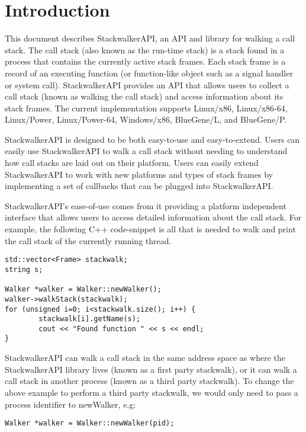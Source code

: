 \section{Introduction}
\label{sec:intro}
This document describes StackwalkerAPI, an API and library for walking a call
stack. The call stack (also known as the run-time stack) is a stack found in a
process that contains the currently active stack frames. Each stack frame is a
record of an executing function (or function-like object such as a signal
handler or system call). StackwalkerAPI provides an API that allows users to
collect a call stack (known as walking the call stack) and access information
about its stack frames. The current implementation supports Linux/x86,
Linux/x86-64, Linux/Power, Linux/Power-64, Windows/x86, BlueGene/L, and BlueGene/P.

StackwalkerAPI is designed to be both easy-to-use and easy-to-extend. Users can
easily use StackwalkerAPI to walk a call stack without needing to understand how
call stacks are laid out on their platform. Users can easily extend
StackwalkerAPI to work with new platforms and types of stack frames by
implementing a set of callbacks that can be plugged into StackwalkerAPI.

StackwalkerAPI's ease-of-use comes from it providing a platform independent
interface that allows users to access detailed information about the call stack.
For example, the following C++ code-snippet is all that is needed to walk and
print the call stack of the currently running thread.

\lstset{language=[GNU]C++,basicstyle=\ttfamily\selectfont\small}
\lstset{numbers=none}
\begin{lstlisting}
std::vector<Frame> stackwalk; 
string s;

Walker *walker = Walker::newWalker();
walker->walkStack(stackwalk);
for (unsigned i=0; i<stackwalk.size(); i++) {
		stackwalk[i].getName(s);
		cout << "Found function " << s << endl;
}	
\end{lstlisting}

StackwalkerAPI can walk a call stack in the same address space as where the
StackwalkerAPI library lives (known as a first party stackwalk), or it can walk
a call stack in another process (known as a third party stackwalk). To change
the above example to perform a third party stackwalk, we would only need to pass
a process identifier to newWalker, e.g: 
\begin{lstlisting}
Walker *walker = Walker::newWalker(pid);
\end{lstlisting}
	
